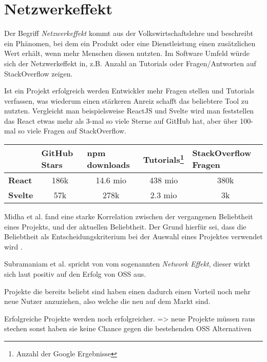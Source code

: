 \section{Netzwerkeffekt}


Der Begriff \textit{Netzwerkeffekt} kommt aus der Volkswirtschaftslehre und beschreibt ein Phänomen,
bei dem ein Produkt oder eine Dienstleistung einen zusätzlichen Wert erhält, wenn mehr Menschen
diesen nutzten.
Im Software Umfeld würde sich der Netzwerkeffekt in, z.B. Anzahl an Tutorials
oder Fragen/Antworten auf StackOverflow zeigen.

Ist ein Projekt erfolgreich werden Entwickler mehr Fragen stellen und Tutorials verfassen,
was wiederum einen stärkeren Anreiz schafft das beliebtere Tool zu nutzten.
Vergleicht man beispielsweise ReactJS und Svelte wird man feststellen das React etwas mehr als 3-mal
so viele Sterne auf GitHub hat, aber über 100-mal so viele Fragen auf StackOverflow.

\begin{table}[h]
    \begin{tabular}{lcccc}
        \hline
                        & \multicolumn{1}{l}{\textbf{GitHub Stars}} & \multicolumn{1}{l}{\textbf{npm downloads}} & \multicolumn{1}{l}{\textbf{Tutorials}\footnote{Anzahl der Google Ergebnisse}} & \multicolumn{1}{l}{\textbf{StackOverflow Fragen}} \\ \hline
        \textbf{React}  & 186k                                      & 14.6 mio                                   & 438 mio                                                                       & 380k                                              \\
        \textbf{Svelte} & 57k                                       & 278k                                       & 2.3 mio                                                                       & 3k
    \end{tabular}%
\end{table}



Midha et al. fand eine starke Korrelation zwischen der vergangenen Beliebtheit eines Projekts,
und der aktuellen Beliebtheit. Der Grund hierfür sei, dass die Beliebtheit
als Entscheidungskriterium bei der Auswahl eines Projektes verwendet wird
\cite{midhaFactorsAffectingSuccess2012}. %

Subramaniam et al. spricht von vom sogenannten \textit{Network Effekt},
dieser wirkt sich laut \cite{subramaniamDeterminantsOpenSource2009} %
positiv auf den Erfolg von OSS aus.

Projekte die bereits beliebt sind haben einen dadurch einen Vorteil noch mehr neue Nutzer anzuziehen,
also welche die neu auf dem Markt sind.

\begin{hypothesis}
    Erfolgreiche Projekte werden noch erfolgreicher. => neue Projekte müssen raus stechen
    sonst haben sie keine Chance gegen die bestehenden OSS Alternativen
\end{hypothesis}